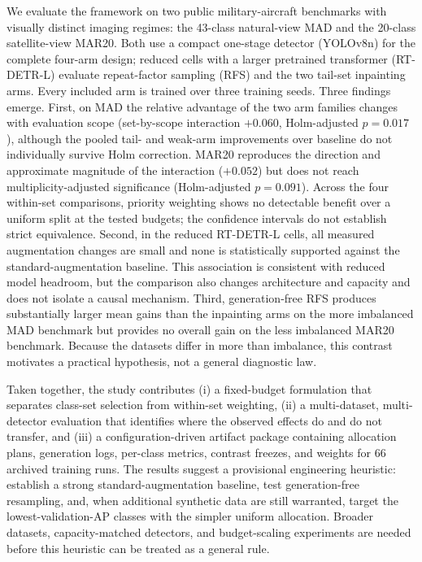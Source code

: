 \documentclass[preprint,12pt,authoryear]{elsarticle}
\begin{document}
We evaluate the framework on two public military-aircraft benchmarks
with visually distinct imaging regimes: the 43-class natural-view MAD
and the 20-class satellite-view MAR20. Both use a compact one-stage
detector (YOLOv8n) for the complete four-arm design; reduced cells with a
larger pretrained transformer (RT-DETR-L) evaluate repeat-factor
sampling (RFS) and the two tail-set inpainting arms. Every included arm
is trained over three training seeds. Three findings emerge. First, on MAD the relative advantage of
the two arm families changes with evaluation scope (set-by-scope
interaction $+0.060$, Holm-adjusted $p = 0.017$), although the pooled
tail- and weak-arm improvements over baseline do not individually survive
Holm correction. MAR20 reproduces the direction and approximate
magnitude of the interaction ($+0.052$) but does not reach
multiplicity-adjusted significance (Holm-adjusted $p = 0.091$). Across the four within-set comparisons, priority weighting
shows no detectable benefit over a uniform split at the tested budgets;
the confidence intervals do not establish strict equivalence. Second,
in the reduced RT-DETR-L cells, all measured augmentation changes are
small and none is statistically supported against the
standard-augmentation baseline.
This association is consistent with reduced model headroom, but the
comparison also changes architecture and capacity and does not isolate a
causal mechanism. Third, generation-free RFS produces substantially
larger mean gains than the inpainting arms on the more imbalanced MAD
benchmark but provides no overall gain on the less imbalanced MAR20
benchmark. Because the datasets differ
in more than imbalance, this contrast motivates a practical hypothesis,
not a general diagnostic law.

Taken together, the study contributes (i) a fixed-budget formulation
that separates class-set selection from within-set weighting, (ii) a
multi-dataset, multi-detector evaluation that identifies where the
observed effects do and do not transfer, and (iii) a configuration-driven
artifact package containing allocation plans, generation logs,
per-class metrics, contrast freezes, and weights for 66 archived training
runs. The results suggest a provisional engineering heuristic: establish
a strong standard-augmentation baseline, test generation-free resampling,
and, when additional synthetic data are still warranted, target the
lowest-validation-AP classes with the simpler uniform allocation. Broader
datasets, capacity-matched detectors, and budget-scaling experiments are
needed before this heuristic can be treated as a general rule.
\end{document}
